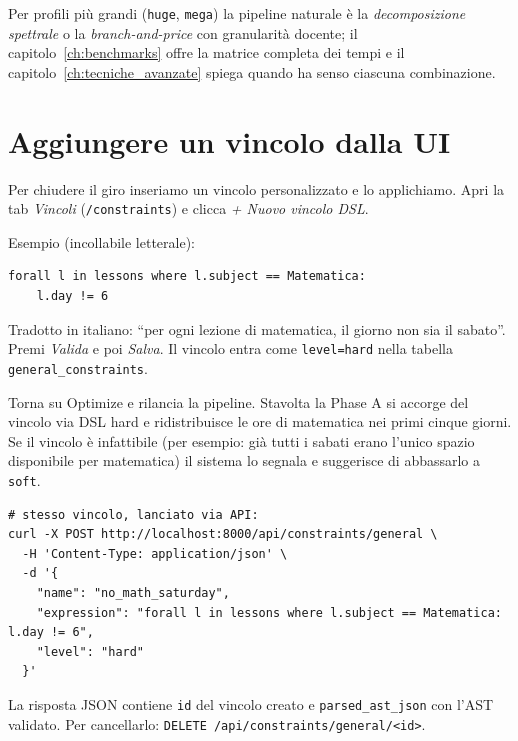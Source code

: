 
Per profili pi\`u grandi (\texttt{huge}, \texttt{mega}) la
pipeline naturale \`e la \emph{decomposizione spettrale} o la
\emph{branch-and-price} con granularit\`a docente; il
capitolo~\ref{ch:benchmarks} offre la matrice completa dei tempi
e il capitolo~\ref{ch:tecniche_avanzate}
spiega quando ha senso ciascuna combinazione.

\section{Aggiungere un vincolo dalla UI}


Per chiudere il giro inseriamo un vincolo personalizzato e lo
applichiamo. Apri la tab \emph{Vincoli} (\texttt{/constraints}) e
clicca \emph{+ Nuovo vincolo DSL}.

Esempio (incollabile letterale):

\begin{lstlisting}
forall l in lessons where l.subject == Matematica:
    l.day != 6
\end{lstlisting}

Tradotto in italiano: ``per ogni lezione di matematica, il giorno
non sia il sabato''. Premi \emph{Valida} e poi \emph{Salva}.
Il vincolo entra come \texttt{level=hard} nella tabella
\texttt{general\_constraints}.

Torna su Optimize e rilancia la pipeline. Stavolta la Phase A
si accorge del vincolo via DSL hard e ridistribuisce le ore di
matematica nei primi cinque giorni. Se il vincolo \`e
infattibile (per esempio: gi\`a tutti i sabati erano l'unico
spazio disponibile per matematica) il sistema lo segnala e
suggerisce di abbassarlo a \texttt{soft}.

\begin{esempiobox}[title=Provalo subito]
\begin{lstlisting}[style=shell]
# stesso vincolo, lanciato via API:
curl -X POST http://localhost:8000/api/constraints/general \
  -H 'Content-Type: application/json' \
  -d '{
    "name": "no_math_saturday",
    "expression": "forall l in lessons where l.subject == Matematica: l.day != 6",
    "level": "hard"
  }'
\end{lstlisting}
La risposta JSON contiene \texttt{id} del vincolo creato e
\texttt{parsed\_ast\_json} con l'AST validato. Per cancellarlo:
\texttt{DELETE /api/constraints/general/<id>}.
\end{esempiobox}

